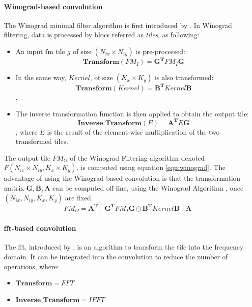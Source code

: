 \paragraph{Winograd-based convolution \newline}
%
The Winograd minimal filter algorithm is first introduced by \cite{winograd_arithmetic_1980}. In Winograd filtering, data is processed by blocs referred as \textit{tiles}, as following:
\begin{itemize}
    \item An input \acrshort{fm} tile $g$ of size $(N_{ix} \times N_{iy})$ is pre-processed: $$\boldsymbol{Transform}(FM_I) = \boldsymbol{G^{T}} FM_I \boldsymbol{G} $$
    \item In the same way, $Kernel$, of size $(K_x \times K_y)$ is also transformed: $$\boldsymbol{Transform}(Kernel) = \boldsymbol{B^{T}} Kernel \boldsymbol{B}$$.
    \item The inverse transformation function is then applied to obtain the output tile: $$\boldsymbol{Inverse\_Transform}(E) = \boldsymbol{A^{T}} E \boldsymbol{G}$$, where $E$ is the result of the element-wise multiplication of the two transformed tiles.
\end{itemize}
The output tile $FM_O$ of the Winograd Filtering algorithm denoted $F(N_{ix} \times N_{iy}, K_x \times K_y)$, is computed using equation \ref{eqn:winograd}. The advantage of using the Winograd-based convolution is that the transformation matrix $\boldsymbol{G}, \boldsymbol{B}, \boldsymbol{A}$ can be computed off-line, using the Winograd Algorithm \cite{winograd_arithmetic_1980}, once $(N_{ix}, N_{iy}, K_x, K_y)$ are fixed.
\begin{equation}
\label{eqn:winograd}
FM_O = \boldsymbol{A^{T}} [ \ \boldsymbol{G^{T}} FM_I \boldsymbol{G} \odot \boldsymbol{B^{T}} Kernel \boldsymbol{B} \ ] \boldsymbol{A}
\end{equation}
%
\paragraph{fft-based convolution \newline}
%
The \acrshort{fft}, introduced by \textcite{cooley_algorithm_1965}, is an algorithm to transform the tile into the frequency domain. It can be integrated into the convolution to reduce the number of operations, where:
\begin{itemize}
    \item $\boldsymbol{Transform} = FFT$
    \item $\boldsymbol{Inverse\_Transform} = IFFT$
\end{itemize}
%

